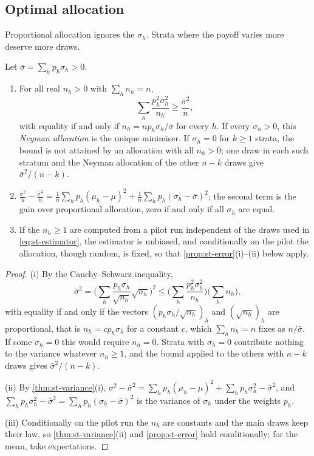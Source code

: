 \subsection{Optimal allocation}

Proportional allocation ignores the $\sigma_h$. Strata where the payoff varies more deserve
more draws.

\begin{proposition}\label{prop:st-optimal}
Let $\bar\sigma=\sum_hp_h\sigma_h>0$.
\begin{enumerate}[label=(\roman*)]
  \item For all real $n_h>0$ with $\sum_hn_h=n$,
    \[
      \sum_h\frac{p_h^2\sigma_h^2}{n_h}\ge\frac{\bar\sigma^2}{n},
    \]
    with equality if and only if $n_h=np_h\sigma_h/\bar\sigma$ for every $h$. If every
    $\sigma_h>0$, this \emph{Neyman allocation} is the unique minimiser. If $\sigma_h=0$ for
    $k\ge1$ strata, the bound is not attained by an allocation with all $n_h>0$; one draw in
    each such stratum and the Neyman allocation of the other $n-k$ draws give
    $\bar\sigma^2/(n-k)$.
  \item $\displaystyle \frac{\sigma^2}{n}-\frac{\bar\sigma^2}{n}
    =\frac1n\sum_hp_h(\mu_h-\mu)^2+\frac1n\sum_hp_h(\sigma_h-\bar\sigma)^2$; the second term
    is the gain over proportional allocation, zero if and only if all $\sigma_h$ are equal.
  \item If the $n_h\ge1$ are computed from a pilot run independent of the draws used in
    \eqref{eq:st-estimator}, the estimator is unbiased, and conditionally on the pilot the
    allocation, though random, is fixed, so that \cref{prop:st-error}(i)--(ii) below apply.
\end{enumerate}
\end{proposition}

\begin{proof}
(i) By the Cauchy--Schwarz inequality,
\[
  \bar\sigma^2=\Big(\sum_h\frac{p_h\sigma_h}{\sqrt{n_h}}\sqrt{n_h}\Big)^2
  \le\Big(\sum_h\frac{p_h^2\sigma_h^2}{n_h}\Big)\Big(\sum_hn_h\Big),
\]
with equality if and only if the vectors $(p_h\sigma_h/\sqrt{n_h})_h$ and $(\sqrt{n_h})_h$ are
proportional, that is $n_h=cp_h\sigma_h$ for a constant $c$, which $\sum_hn_h=n$ fixes as
$n/\bar\sigma$. If some $\sigma_h=0$ this would require $n_h=0$. Strata with $\sigma_h=0$
contribute nothing to the variance whatever $n_h\ge1$, and the bound applied to the others
with $n-k$ draws gives $\bar\sigma^2/(n-k)$.

(ii) By \cref{thm:st-variance}(i),
$\sigma^2-\bar\sigma^2=\sum_hp_h(\mu_h-\mu)^2+\sum_hp_h\sigma_h^2-\bar\sigma^2$, and
$\sum_hp_h\sigma_h^2-\bar\sigma^2=\sum_hp_h(\sigma_h-\bar\sigma)^2$ is the variance of
$\sigma_h$ under the weights $p_h$.

(iii) Conditionally on the pilot run the $n_h$ are constants and the main draws keep their
law, so \cref{thm:st-variance}(ii) and \cref{prop:st-error} hold conditionally; for the mean,
take expectations.
\end{proof}

